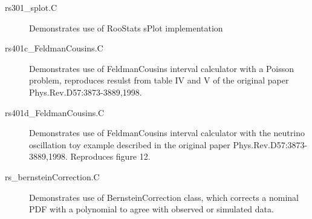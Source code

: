\documentclass[11pt]{article}
\begin{document}
\begin{description}
\item[rs301\_splot.C] Demonstrates use of RooStats sPlot implementation

\item[rs401c\_FeldmanCousins.C] Demonstrates use of FeldmanCousins interval calculator with a Poisson problem, reproduces resulst from table IV and V of the original paper Phys.Rev.D57:3873-3889,1998.

\item[rs401d\_FeldmanCousins.C] Demonstrates use of FeldmanCousins interval calculator with the neutrino oscillation toy example described in the original paper Phys.Rev.D57:3873-3889,1998. Reproduces figure 12.

\item[rs\_bernsteinCorrection.C] Demonstrates use of BernsteinCorrection class, which corrects a nominal PDF with a polynomial to agree with observed or simulated data.


\end{description}
\end{document}

